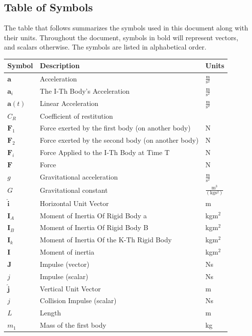 \documentclass[12pt]{article}
\begin{document}
\subsection{Table of Symbols}
\label{Sec:ToS}
The table that follows summarizes the symbols used in this document along with their units. Throughout the document, symbols in bold will represent vectors, and scalars otherwise. The symbols are listed in alphabetical order.
\begin{longtabu}{l X[l] l}
\toprule
Symbol & Description & Units
\\
\midrule
$\mathbf{a}$ & Acceleration & $\frac{\text{m}}{\text{s}^{2}}$
\\
${\mathbf{a}_{i}}$ & The I-Th Body's Acceleration & $\frac{\text{m}}{\text{s}^{2}}$
\\
$\mathbf{a}(t)$ & Linear Acceleration & $\frac{\text{m}}{\text{s}^{2}}$
\\
${C_{R}}$ & Coefficient of restitution & 
\\
${\mathbf{F}_{1}}$ & Force exerted by the first body (on another body) & N
\\
${\mathbf{F}_{2}}$ & Force exerted by the second body (on another body) & N
\\
${\mathbf{F}_{i}}$ & Force Applied to the I-Th Body at Time T & N
\\
$\mathbf{F}$ & Force & N
\\
$g$ & Gravitational acceleration & $\frac{\text{m}}{\text{s}^{2}}$
\\
$G$ & Gravitational constant & $\frac{\text{m}^{3}}{(\text{kg}\text{s}^{2})}$
\\
$\mathbf{\hat{i}}$ & Horizontal Unit Vector & m
\\
${\mathbf{I}_{A}}$ & Moment of Inertia Of Rigid Body a & kg$\text{m}^{2}$
\\
${\mathbf{I}_{B}}$ & Moment of Inertia Of Rigid Body B & kg$\text{m}^{2}$
\\
${\mathbf{I}_{k}}$ & Moment of Inertia Of the K-Th Rigid Body & kg$\text{m}^{2}$
\\
$\mathbf{I}$ & Moment of inertia & kg$\text{m}^{2}$
\\
$\mathbf{J}$ & Impulse (vector) & Ns
\\
$j$ & Impulse (scalar) & Ns
\\
$\mathbf{\hat{j}}$ & Vertical Unit Vector & m
\\
$j$ & Collision Impulse (scalar) & Ns
\\
$L$ & Length & m
\\
${m_{1}}$ & Mass of the first body & kg

\end{longtabu}
\end{document}
